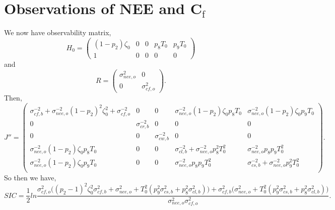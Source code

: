 \documentclass[11pt]{article}
\begin{document}
\section*{Observations of NEE and C$_\text{f}$}
We now have observability matrix,
\[
H_{0} = \begin{pmatrix}
(1-p_{2})\zeta_0 & 0 & 0 & p_{8}T_{0} & p_{9}T_{0}\\
1 & 0 & 0 & 0 & 0
\end{pmatrix}
\]
and 
\[
R= \begin{pmatrix}
\sigma_{nee,o}^{2} & 0 \\
0 & \sigma_{cf,o}^{2}
\end{pmatrix}.
\]
Then,
\[
J'' = \begin{pmatrix}
\sigma_{cf,b}^{-2}+\sigma_{nee,o}^{-2}(1-p_{2})^{2}\zeta_0^{2}+\sigma_{cf,o}^{-2} & 0 & 0 & \sigma_{nee,o}^{-2}(1-p_{2})\zeta_0 p_{8}T_0 & \sigma_{nee,o}^{-2}(1-p_{2})\zeta_0 p_{9}T_0 \\
0 & \sigma_{cr,b}^{-2} & 0 & 0 & 0 \\
0 & 0 & \sigma_{cw,b}^{-2} & 0 & 0 \\
\sigma_{nee,o}^{-2}(1-p_{2})\zeta_0 p_{8}T_0 & 0 & 0 & \sigma_{cl,b}^{-2}+\sigma_{nee,o}^{-2}p_{8}^2 T_0^2 & \sigma_{nee,o}^{-2}p_{8}p_{9} T_0^2 \\
\sigma_{nee,o}^{-2}(1-p_{2})\zeta_0 p_{9}T_0 & 0 & 0 & \sigma_{nee,o}^{-2}p_{8}p_{9} T_0^2 & \sigma_{cs,b}^{-2}+\sigma_{nee,o}^{-2}p_{9}^2 T_0^2 \\
\end{pmatrix}.
\]
So then we have,
\[
SIC = \frac{1}{2}ln\frac{\sigma_{cf,o}^2\big((p_{2}-1)^{2}\zeta_0^{2}\sigma_{cf,b}^{2}+\sigma_{nee,o}^{2}+T_{0}^2(p_{9}^2\sigma_{cs,b}^2+p_8^2\sigma_{cl,b}^2)\big)+\sigma_{cf,b}^2\big(\sigma_{nee,o}^{2}+T_{0}^2(p_{9}^2\sigma_{cs,b}^2+p_8^2\sigma_{cl,b}^2)\big)}{\sigma_{nee,o}^{2}\sigma_{cf,o}^2}.
\]
\end{document}
